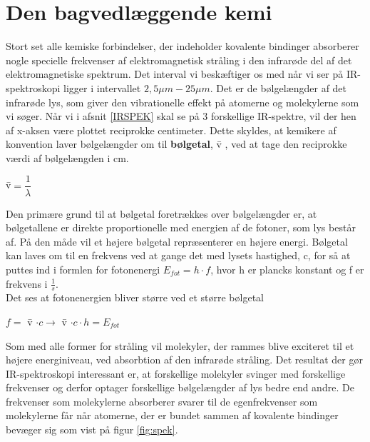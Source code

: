 \section{Den bagvedlæggende kemi}
Stort set alle kemiske forbindelser, der indeholder kovalente bindinger absorberer nogle specielle frekvenser af elektromagnetisk stråling i den infrarøde del af det elektromagnetiske spektrum. Det interval vi beskæftiger os med når vi ser på IR-spektroskopi ligger i intervallet $2,5 \mu m- 25 \mu m $. Det er de bølgelængder af det infrarøde lys, som giver den vibrationelle effekt på atomerne og molekylerne som vi søger. Når vi i afsnit \ref{IRSPEK} skal se på 3 forskellige IR-spektre, vil der hen af x-aksen være plottet reciprokke centimeter. Dette skyldes, at kemikere af konvention laver bølgelængder om til \textbf{bølgetal}, \={v} , ved at tage den reciprokke værdi af bølgelængden i cm.

\begin{center}
\={v}$= \dfrac{1}{\lambda}$
\end{center}

Den primære grund til at bølgetal foretrækkes over bølgelængder er, at bølgetallene er direkte proportionelle med energien af de fotoner, som lys består af. På den måde vil et højere bølgetal repræsenterer en højere energi. Bølgetal kan laves om til en frekvens ved at gange det med lysets hastighed, c, for så at puttes ind i formlen for fotonenergi $E_{fot} = h \cdot f$, hvor h er plancks konstant og f er frekvens i $\frac{1}{s}$. 
\\

Det ses at fotonenergien bliver større ved et større bølgetal 
\\

\begin{center}
$f =$ \={v} $\cdot c \rightarrow$ \={v} $\cdot c \cdot h = E_{fot}$
\end{center}

Som med alle former for stråling vil molekyler, der rammes blive exciteret til et højere energiniveau, ved absorbtion af den infrarøde stråling. Det resultat der gør IR-spektroskopi interessant er, at  forskellige molekyler svinger med forskellige frekvenser og derfor optager forskellige bølgelængder af lys bedre end andre. De frekvenser som molekylerne absorberer svarer til de egenfrekvenser som molekylerne får når atomerne, der er bundet sammen af kovalente bindinger bevæger sig som vist på figur \ref{fig:spek}. 
\\

